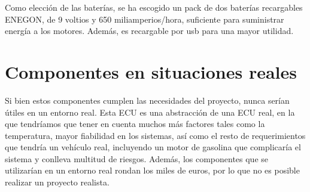  Como elección de las baterías, se ha escogido un pack de dos baterías recargables ENEGON, de 9 voltios y 650 miliamperios/hora, suficiente para suministrar energía a los motores. Además, es recargable por usb para una mayor utilidad.
 
\section{Componentes en situaciones reales}

Si bien estos componentes cumplen las necesidades del proyecto, nunca serían útiles en un entorno real. Esta ECU es una abstracción de una ECU real, en la que tendríamos que tener en cuenta muchos más factores tales como la temperatura, mayor fiabilidad en los sistemas, así como el resto de requerimientos que tendría un vehículo real, incluyendo un motor de gasolina que complicaría el sistema y conlleva multitud de riesgos. Además, los componentes que se utilizarían en un entorno real rondan los miles de euros, por lo que no es posible realizar un proyecto realista. 